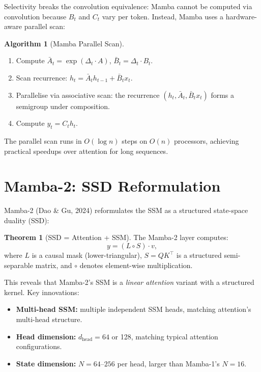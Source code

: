 \documentclass[11pt,a4paper]{book}
\theoremstyle{definition}
\newtheorem{theorem}{Theorem}[chapter]
\newtheorem{algorithm}{Algorithm}[chapter]
\begin{document}
Selectivity breaks the convolution equivalence: Mamba cannot be computed via convolution because $B_t$ and $C_t$ vary per token. Instead, Mamba uses a hardware-aware parallel scan:

\begin{algorithm}[Mamba Parallel Scan]
	\begin{enumerate}
		\item Compute $\bar{A}_t = \exp(\Delta_t \cdot A)$, $\bar{B}_t = \Delta_t \cdot B_t$.
		\item Scan recurrence: $h_t = \bar{A}_t h_{t-1} + \bar{B}_t x_t$.
		\item Parallelise via associative scan: the recurrence $(h_t, \bar{A}_t, \bar{B}_t x_t)$ forms a semigroup under composition.
		\item Compute $y_t = C_t h_t$.
	\end{enumerate}
\end{algorithm}

The parallel scan runs in $O(\log n)$ steps on $O(n)$ processors, achieving practical speedups over attention for long sequences.

\section{Mamba-2: SSD Reformulation}

Mamba-2 (Dao \& Gu, 2024) reformulates the SSM as a structured state-space duality (SSD):

\begin{theorem}[SSD = Attention + SSM]
	The Mamba-2 layer computes:
	\begin{equation}
		y = (L \circ S) \cdot v,
	\end{equation}
	where $L$ is a causal mask (lower-triangular), $S = Q K^\top$ is a structured semi-separable matrix, and $\circ$ denotes element-wise multiplication.
\end{theorem}

This reveals that Mamba-2's SSM is a \emph{linear attention} variant with a structured kernel. Key innovations:
\begin{itemize}
	\item \textbf{Multi-head SSM:} multiple independent SSM heads, matching attention's multi-head structure.
	\item \textbf{Head dimension:} $d_{\text{head}} = 64$ or 128, matching typical attention configurations.
	\item \textbf{State dimension:} $N = 64$--$256$ per head, larger than Mamba-1's $N=16$.
\end{itemize}
\end{document}
